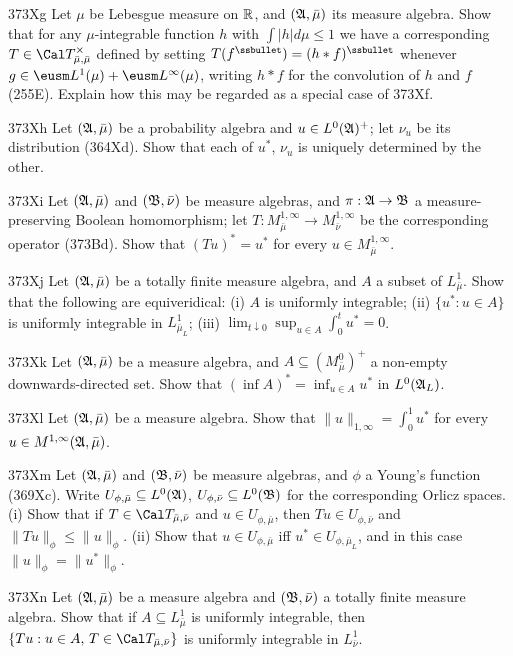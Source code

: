 {\sqheader 373Xg Let $\mu$ be Lebesgue measure on $\Bbb R$, and 
$(\frak A,\bar\mu)$ its measure algebra.   Show that for any 
$\mu$-integrable function $h$ with $\int|h|d\mu\le 1$ we have a 
corresponding $T\in\Cal T^{\times}_{\bar\mu,\bar\mu}$ defined by setting
$T(f^{\ssbullet})=(h*f)^{\ssbullet}$ whenever 
$g\in\eusm L^1(\mu)+\eusm L^{\infty}(\mu)$, writing $h*f$ for the 
convolution of $h$ and $f$
(255E).   Explain how this may be regarded as a special case of 373Xf.
     
\sqheader 373Xh Let $(\frak A,\bar\mu)$ be a probability algebra and
$u\in L^0(\frak A)^+$;  let $\nu_u$ be its distribution (364Xd).   Show that each of $u^*$, $\nu_u$ is uniquely determined by the other.
     
\spheader 373Xi Let $(\frak A,\bar\mu)$ and $(\frak B,\bar\nu)$ be
measure algebras, and $\pi:\frak A\to\frak B$ a measure-preserving
Boolean homomorphism;  let $T:M^{1,\infty}_{\bar\mu}\to
M^{1,\infty}_{\bar\nu}$ be the corresponding operator (373Bd).   Show
that $(Tu)^*=u^*$ for every $u\in M^{1,\infty}_{\bar\mu}$.
     
\spheader 373Xj Let $(\frak A,\bar\mu)$ be a totally finite measure
algebra, and $A$ a subset of $L^1_{\bar\mu}$.   Show that the following
are equiveridical:  (i) $A$ is uniformly integrable;
(ii) $\{u^*:u\in A\}$ is uniformly integrable in $L^1_{\bar\mu_L}$;
(iii) $\lim_{t\downarrow 0}\sup_{u\in A}\int_0^tu^*=0$.
     
\spheader 373Xk Let $(\frak A,\bar\mu)$ be a measure algebra, and
$A\subseteq (M^0_{\bar\mu})^+$ a non-empty downwards-directed set.
Show that $(\inf A)^*=\inf_{u\in A}u^*$ in $L^0(\frak A_L)$.
     
\spheader 373Xl Let $(\frak A,\bar\mu)$ be a measure algebra.   Show
that $\|u\|_{1,\infty}=\int_0^1u^*$ for every
$u\in M^{1,\infty}(\frak A,\bar\mu)$.
     
\spheader 373Xm Let $(\frak A,\bar\mu)$ and $(\frak B,\bar\nu)$ be
measure algebras, and $\phi$ a Young's function
(369Xc).   Write $U_{\phi,\bar\mu}\subseteq L^0(\frak A)$,
$U_{\phi,\bar\nu}\subseteq L^0(\frak B)$ for the corresponding Orlicz
spaces.   (i) Show that if $T\in\Cal T_{\bar\mu,\bar\nu}$ and $u\in
U_{\phi,\bar\mu}$, then $Tu\in U_{\phi,\bar\nu}$ and
$\|Tu\|_{\phi}\le\|u\|_{\phi}$.  (ii) Show that $u\in U_{\phi,\bar\mu}$
iff $u^*\in U_{\phi,\bar\mu_L}$, and in this case
$\|u\|_{\phi}=\|u^*\|_{\phi}$.
     
\sqheader 373Xn Let $(\frak A,\bar\mu)$ be a measure algebra and 
$(\frak B,\bar\nu)$ a totally finite measure algebra.   Show that if 
$A\subseteq L^1_{\bar\mu}$ is uniformly integrable, then 
$\{Tu:u\in A,\,T\in\Cal T_{\bar\mu,\bar\nu}\}$ is uniformly integrable in
$L^1_{\bar\nu}$.
     
}
